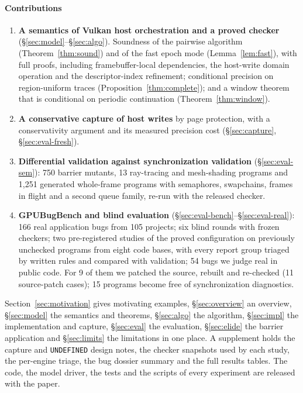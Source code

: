 \documentclass[acmtog,anonymous,review]{acmart}
\newcommand{\bench}{GPUBugBench\xspace}
\newcommand{\code}[1]{\texttt{#1}}
\begin{document}
\paragraph{Contributions}
\begin{enumerate}
\item \textbf{A semantics of Vulkan host orchestration and a proved checker} (\S\ref{sec:model}--\S\ref{sec:algo}).
  Soundness of the pairwise algorithm (Theorem~\ref{thm:sound}) and of the fast epoch mode
  (Lemma~\ref{lem:fast}), with full proofs, including framebuffer-local dependencies, the host-write domain
  operation and the descriptor-index refinement; conditional precision on region-uniform traces
  (Proposition~\ref{thm:complete}); and a window theorem that is conditional on periodic continuation
  (Theorem~\ref{thm:window}).
\item \textbf{A conservative capture of host writes} by page protection, with a conservativity argument and its
  measured precision cost (\S\ref{sec:capture}, \S\ref{sec:eval-fresh}).
\item \textbf{Differential validation against synchronization validation} (\S\ref{sec:eval-sem}): 750 barrier
  mutants, 13 ray-tracing and mesh-shading programs and 1,251 generated whole-frame programs with semaphores,
  swapchains, frames in flight and a second queue family, re-run with the released checker.
\item \textbf{\bench and blind evaluation} (\S\ref{sec:eval-bench}--\S\ref{sec:eval-real}): 166 real application
  bugs from 105 projects; six blind rounds with frozen checkers; two pre-registered studies of the proved
  configuration on previously unchecked programs from eight code bases, with every report group triaged by written rules and compared
  with validation; 54 bugs we judge real in public code. For 9 of them we patched the source, rebuilt and re-checked
  (11 source-patch cases); 15 programs become free of synchronization diagnostics.
\end{enumerate}
Section~\ref{sec:motivation} gives motivating examples, \S\ref{sec:overview} an overview, \S\ref{sec:model} the
semantics and theorems, \S\ref{sec:algo} the algorithm, \S\ref{sec:impl} the implementation and capture,
\S\ref{sec:eval} the evaluation, \S\ref{sec:elide} the barrier application and \S\ref{sec:limits} the limitations
in one place. A supplement holds the capture and \code{UNDEFINED} design notes, the checker snapshots used by each
study, the per-engine triage, the bug dossier summary and the full results tables. The code, the model driver, the
tests and the scripts of every experiment are released with the paper.
\end{document}
